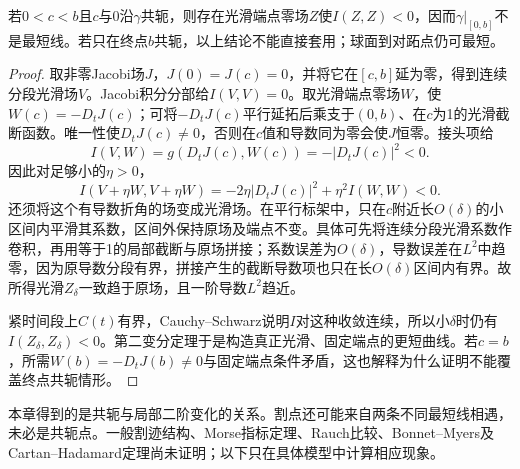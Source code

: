 \begin{theorem}[内点共轭之后不再最短]\label{thm:conjugate-nonminimizing}
若$0<c<b$且$c$与0沿$\gamma$共轭，则存在光滑端点零场$Z$使$I(Z,Z)<0$，因而$\gamma|_{[0,b]}$不是最短线。若只在终点$b$共轭，以上结论不能直接套用；球面到对跖点仍可最短。
\end{theorem}
\begin{proof}
取非零Jacobi场$J$，$J(0)=J(c)=0$，并将它在$[c,b]$延为零，得到连续分段光滑场$V$。Jacobi积分分部给$I(V,V)=0$。取光滑端点零场$W$，使$W(c)=-D_tJ(c)$；可将$-D_tJ(c)$平行延拓后乘支于$(0,b)$、在$c$为1的光滑截断函数。唯一性使$D_tJ(c)\ne0$，否则在$c$值和导数同为零会使$J$恒零。接头项给
\[
 I(V,W)=g(D_tJ(c),W(c))=-|D_tJ(c)|^2<0.
\]
因此对足够小的$\eta>0$，
\[
 I(V+\eta W,V+\eta W)
 =-2\eta|D_tJ(c)|^2+\eta^2I(W,W)<0.
\]
还须将这个有导数折角的场变成光滑场。在平行标架中，只在$c$附近长$O(\delta)$的小区间内平滑其系数，区间外保持原场及端点不变。具体可先将连续分段光滑系数作卷积，再用等于1的局部截断与原场拼接；系数误差为$O(\delta)$，导数误差在$L^2$中趋零，因为原导数分段有界，拼接产生的截断导数项也只在长$O(\delta)$区间内有界。故所得光滑$Z_\delta$一致趋于原场，且一阶导数$L^2$趋近。

紧时间段上$C(t)$有界，Cauchy--Schwarz说明$I$对这种收敛连续，所以小$\delta$时仍有$I(Z_\delta,Z_\delta)<0$。第二变分定理于是构造真正光滑、固定端点的更短曲线。若$c=b$，所需$W(b)=-D_tJ(b)\ne0$与固定端点条件矛盾，这也解释为什么证明不能覆盖终点共轭情形。
\end{proof}

本章得到的是共轭与局部二阶变化的关系。割点还可能来自两条不同最短线相遇，未必是共轭点。一般割迹结构、Morse指标定理、Rauch比较、Bonnet--Myers及Cartan--Hadamard定理尚未证明；以下只在具体模型中计算相应现象。
